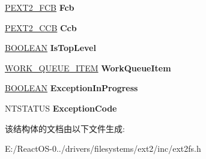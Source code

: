 \begin{DoxyCompactItemize}
\hyperlink{struct___e_x_t2___f_c_b}{P\+E\+X\+T2\+\_\+\+F\+CB} {\bfseries Fcb}
\item 
\mbox{\label{structext2__icb_a0a8c541f1e435f21ddf5c4f5e0e92ca4}} 
\hyperlink{struct___e_x_t2___c_c_b}{P\+E\+X\+T2\+\_\+\+C\+CB} {\bfseries Ccb}
\item 
\mbox{\label{structext2__icb_ace5cc74a9a3ce68dd7f3b180bcdb8737}} 
\hyperlink{_processor_bind_8h_a112e3146cb38b6ee95e64d85842e380a}{B\+O\+O\+L\+E\+AN} {\bfseries Is\+Top\+Level}
\item 
\mbox{\label{structext2__icb_a35d239c1ab586822c4d401cebd57fc49}} 
\hyperlink{struct___w_o_r_k___q_u_e_u_e___i_t_e_m}{W\+O\+R\+K\+\_\+\+Q\+U\+E\+U\+E\+\_\+\+I\+T\+EM} {\bfseries Work\+Queue\+Item}
\item 
\mbox{\label{structext2__icb_adab3b35a7b883dde505d999a4b646b96}} 
\hyperlink{_processor_bind_8h_a112e3146cb38b6ee95e64d85842e380a}{B\+O\+O\+L\+E\+AN} {\bfseries Exception\+In\+Progress}
\item 
\mbox{\label{structext2__icb_ab917dba21c31ca5f545663ef17a273d5}} 
N\+T\+S\+T\+A\+T\+US {\bfseries Exception\+Code}
\end{DoxyCompactItemize}


该结构体的文档由以下文件生成\+:\begin{DoxyCompactItemize}
\item 
E\+:/\+React\+O\+S-\/0../drivers/filesystems/ext2/inc/ext2fs.\+h\end{DoxyCompactItemize}
